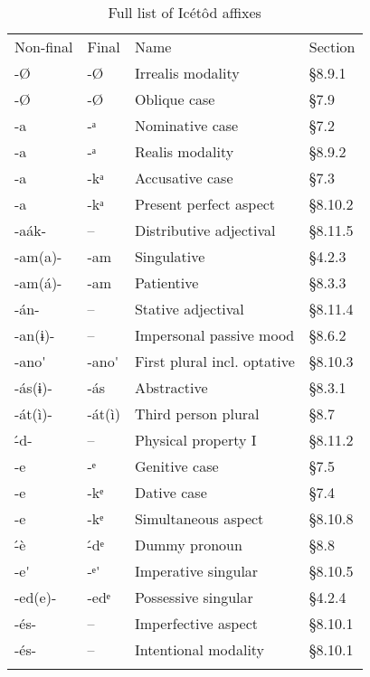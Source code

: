 \begin{table}
\caption{ Full list of Icétôd affixes}

\begin{tabularx}{\textwidth}{XXXX}
\lsptoprule

Non-final & Final & Name & Section\\
{}-Ø & {}-Ø & Irrealis modality & §8.9.1\\
{}-Ø & {}-Ø & Oblique case & §7.9\\
{}-a & {}-ᵃ & Nominative case & §7.2\\
{}-a & {}-ᵃ & Realis modality & §8.9.2\\
{}-a & {}-kᵃ & Accusative case & §7.3\\
{}-a & {}-kᵃ & Present perfect aspect & §8.10.2\\
{}-aák- & – & Distributive adjectival & §8.11.5\\
{}-am(a)- & {}-am & Singulative & §4.2.3\\
{}-am(á)- & {}-am & Patientive & §8.3.3\\
{}-án- & – & Stative adjectival & §8.11.4\\
{}-an(ɨ)- & – & Impersonal passive mood & §8.6.2\\
{}-ano\'{}  & {}-ano\'{}  & First plural incl. optative & §8.10.3\\
{}-ás(ɨ)- & {}-ás & Abstractive & §8.3.1\\
{}-át(ì)- & {}-át(ì) & Third person plural & §8.7\\
{}\'{-}d- & – & Physical property I & §8.11.2\\
{}-e & {}-ᵉ & Genitive case & §7.5\\
{}-e & {}-kᵉ & Dative case & §7.4\\
{}-e & {}-kᵉ & Simultaneous aspect & §8.10.8\\
{}\'{-}è & {}\'{-}dᵉ & Dummy pronoun & §8.8\\
{}-e\'{}  & {}-ᵉ\'{}  & Imperative singular & §8.10.5\\
{}-ed(e)- & {}-edᵉ & Possessive singular & §4.2.4\\
{}-és- & – & Imperfective aspect & §8.10.1\\
{}-és- & – & Intentional modality & §8.10.1\\
\lspbottomrule
\end{tabularx} 

\end{table}


